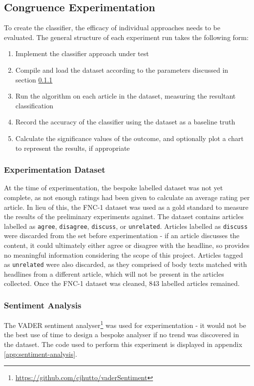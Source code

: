 \subsection{Congruence Experimentation}
To create the classifier, the efficacy of individual approaches needs to be evaluated. The general structure of each experiment run takes the following form:

\begin{enumerate}
	\item Implement the classifier approach under test
	\item Compile and load the dataset according to the parameters discussed in section \ref{experimentation-data}
	\item Run the algorithm on each article in the dataset, measuring the resultant classification
	\item Record the accuracy of the classifier using the dataset as a baseline truth
	\item Calculate the significance	values of the outcome, and optionally plot a chart to represent the results, if appropriate
\end{enumerate}

\subsubsection{Experimentation Dataset}\label{experimentation-data}
At the time of experimentation, the bespoke labelled dataset was not yet complete, as not enough ratings had been given to calculate an average rating per article. In lieu of this, the FNC-1 dataset was used as a gold standard to measure the results of the preliminary experiments against. The dataset contains articles labelled as \texttt{agree}, \texttt{disagree}, \texttt{discuss}, or \texttt{unrelated}. Articles labelled as \texttt{discuss} were discarded from the set before experimentation - if an article discusses the content, it could ultimately either agree or disagree with the headline, so provides no meaningful information considering the scope of this project. Articles tagged as \texttt{unrelated} were also discarded, as they comprised of body texts matched with headlines from a different article, which will not be present in the articles collected. Once the FNC-1 dataset was cleaned, 843 labelled articles remained.


\subsubsection{Sentiment Analysis}
The VADER sentiment analyser\footnote{\url{https://github.com/cjhutto/vaderSentiment}} was used for experimentation - it would not be the best use of time to design a bespoke analyser if no trend was discovered in the dataset. The code used to perform this experiment is displayed in appendix \ref{app:sentiment-analysis}.


